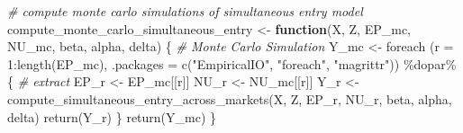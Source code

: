 \documentclass[
]{article}
\newenvironment{Shaded}{\begin{snugshade}}{\end{snugshade}}
\newcommand{\AttributeTok}[1]{\textcolor[rgb]{0.77,0.63,0.00}{#1}}
\newcommand{\CommentTok}[1]{\textcolor[rgb]{0.56,0.35,0.01}{\textit{#1}}}
\newcommand{\ControlFlowTok}[1]{\textcolor[rgb]{0.13,0.29,0.53}{\textbf{#1}}}
\newcommand{\DecValTok}[1]{\textcolor[rgb]{0.00,0.00,0.81}{#1}}
\newcommand{\FunctionTok}[1]{\textcolor[rgb]{0.00,0.00,0.00}{#1}}
\newcommand{\NormalTok}[1]{#1}
\newcommand{\OtherTok}[1]{\textcolor[rgb]{0.56,0.35,0.01}{#1}}
\newcommand{\SpecialCharTok}[1]{\textcolor[rgb]{0.00,0.00,0.00}{#1}}
\newcommand{\StringTok}[1]{\textcolor[rgb]{0.31,0.60,0.02}{#1}}
\begin{document}
\begin{Shaded}
\begin{Highlighting}[]
\CommentTok{\# compute monte carlo simulations of simultaneous entry model}
\NormalTok{compute\_monte\_carlo\_simultaneous\_entry }\OtherTok{\textless{}{-}}
  \ControlFlowTok{function}\NormalTok{(X, Z, EP\_mc, NU\_mc, }
\NormalTok{           beta, alpha, delta) \{}
    \CommentTok{\# Monte Carlo Simulation}
\NormalTok{    Y\_mc }\OtherTok{\textless{}{-}}
      \FunctionTok{foreach}\NormalTok{ (}\AttributeTok{r =} \DecValTok{1}\SpecialCharTok{:}\FunctionTok{length}\NormalTok{(EP\_mc), }\AttributeTok{.packages =} \FunctionTok{c}\NormalTok{(}\StringTok{"EmpiricalIO"}\NormalTok{, }\StringTok{"foreach"}\NormalTok{, }\StringTok{"magrittr"}\NormalTok{)) }\SpecialCharTok{\%dopar\%}\NormalTok{ \{}
        \CommentTok{\# extract}
\NormalTok{        EP\_r }\OtherTok{\textless{}{-}}\NormalTok{ EP\_mc[[r]]}
\NormalTok{        NU\_r }\OtherTok{\textless{}{-}}\NormalTok{ NU\_mc[[r]]}
\NormalTok{        Y\_r }\OtherTok{\textless{}{-}}
          \FunctionTok{compute\_simultaneous\_entry\_across\_markets}\NormalTok{(X, Z, EP\_r, NU\_r, beta, alpha, delta)}
        \FunctionTok{return}\NormalTok{(Y\_r)}
\NormalTok{      \}}
    \FunctionTok{return}\NormalTok{(Y\_mc)}
\NormalTok{  \}}


\end{Highlighting}
\end{Shaded}
\end{document}
